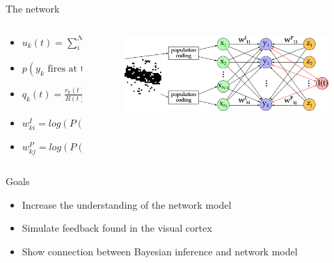 \documentclass[aspectratio=169]{beamer}
\begin{document}
\begin{frame}{The network}
\vspace{-1.5cm}
  \begin{columns}[onlytextwidth]
	\begin{column}{0.5\textwidth}
	  \begin{itemize}
	    \item \small $u_k(t) = \sum_{i=1}^N w^{I}_{ki} \cdot x_i(t) + \sum_{j=1}^J w^{P}_{kj} \cdot z_j(t)$
	    \item \small $p(y_k \text{ fires at time t}) \propto e^{u_k(t) - I(t)}$
	    \item \small $q_k(t) = \frac{r_k(t) \delta t}{R(t) \delta t} = \frac{e^{u_k(t) - I(t)}}{\sum_{k'=1}^K e^{u_{k'}(t) - I(t)}} = \frac{e^{u_k(t)}}{\sum_{k'=1}^K e^{u_{k'}(t)}}$
	    \item \small $w^{I}_{ki} = log(P(x_i = 1 | Y = k))$
	    \item \small $w^{P}_{kj} = log(P(Y = k | Z = j))$
	  \end{itemize}
    \end{column}
    \begin{column}{0.5\textwidth}
        \begin{figure}
        \includegraphics[width=1\linewidth]{../Latex/figures/networkPlan.png}
      \end{figure} 
	\end{column}
  \end{columns}
\end{frame}

\begin{frame}{Goals}


  \begin{itemize}

    \item Increase the understanding of the network model
    \item Simulate feedback found in the visual cortex
    \item Show connection between Bayesian inference and network model
  \end{itemize}
\end{frame}
\end{document}
